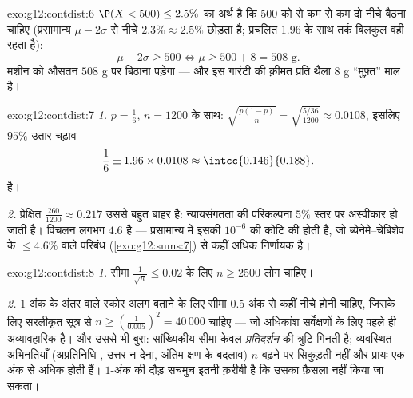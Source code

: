\begin{solution}{exo:g12:contdist:6}
$\P(X < 500) \leq 2.5\%$ का अर्थ है कि $500$ को  से कम से कम दो  नीचे बैठना चाहिए
(प्रसामान्य $\mu - 2\sigma$ से नीचे $2.3\% \approx 2.5\%$ छोड़ता है; प्रचलित $1.96$ के साथ तर्क बिलकुल वही
रहता है):
\[
\mu - 2\sigma \geq 500 \iff \mu \geq 500 + 8 = 508 \text{ g}.
\]
मशीन को औसतन $508$ g पर बिठाना पड़ेगा --- और इस गारंटी की क़ीमत प्रति थैला $8$
g ``मुफ़्त'' माल है।
\end{solution}

\begin{solution}{exo:g12:contdist:7}
\emph{1.} $p = \frac16$, $n = 1200$ के साथ: $\sqrt{\frac{p(1-p)}{n}} = \sqrt{\frac{5/36}{1200}} \approx 0.0108$, इसलिए $95\%$ उतार-चढ़ाव 
\[
\frac16 \pm 1.96 \times 0.0108 \approx \intcc{0.146}{0.188}.
\]
है।

\emph{2.} प्रेक्षित  $\frac{260}{1200} \approx 0.217$ उससे बहुत बाहर है: न्यायसंगतता की
परिकल्पना $5\%$ स्तर पर अस्वीकार हो जाती है। विचलन लगभग $4.6$  है ---
प्रसामान्य  में इसकी  $10^{-6}$ की कोटि की होती है, जो
ब्येनेमे--चेबिशेव के $\leq 4.6\%$ वाले परिबंध (\cref{exo:g12:sums:7}) से कहीं अधिक निर्णायक है।
\end{solution}

\begin{solution}{exo:g12:contdist:8}
\emph{1.} सीमा $\frac{1}{\sqrt n} \leq 0.02$ के लिए $n \geq 2500$ लोग चाहिए।

\emph{2.} $1$ अंक के अंतर वाले स्कोर अलग बताने के लिए सीमा $0.5$ अंक से कहीं
नीचे होनी चाहिए, जिसके लिए सरलीकृत सूत्र से $n \geq \left(\frac{1}{0.005}\right)^2 =
40\,000$ चाहिए --- जो अधिकांश
सर्वेक्षणों के लिए पहले ही अव्यावहारिक है। और उससे भी बुरा: सांख्यिकीय सीमा
केवल \emph{प्रतिदर्शन} की त्रुटि गिनती है; व्यवस्थित अभिनतियाँ (अप्रतिनिधि
, उत्तर न देना, अंतिम क्षण के बदलाव) $n$ बढ़ने पर सिकुड़ती नहीं और
प्रायः एक अंक से अधिक होती हैं। $1$-अंक की दौड़ सचमुच इतनी क़रीबी है कि उसका
फ़ैसला नहीं किया जा सकता।
\end{solution}

